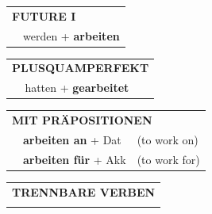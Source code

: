 \documentclass[10pt,a4paper]{revtex4-2}
\begin{document}
\begin{verbbox}
\begin{tabular}{rl}
    \multicolumn{2}{l}{\textbf{FUTURE I} }\\
   & werden + \textbf{arbeiten}\\
 
  \end{tabular}
\hfill
   \begin{tabular}{rl}
      \multicolumn{2}{l}{\textbf{PLUSQUAMPERFEKT}}\\
   & hatten + \textbf{gearbeitet}\\
  \end{tabular}
  

    \vspace{10pt}
    
   \begin{tabular}{lll}
      \multicolumn{3}{l}{\textbf{MIT PRÄPOSITIONEN}}\\
& \textbf{arbeiten an} + Dat & (to work on)\\
& \textbf{arbeiten für} + Akk & (to work for)\\
   \end{tabular}
  \hfill
   \begin{tabular}{lll}
      \multicolumn{3}{l}{\textbf{TRENNBARE VERBEN}}\\
\vspace{20pt}
  \end{tabular}


  \vspace{-5pt}

\end{verbbox}
\end{document}

